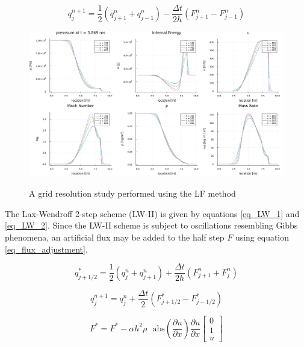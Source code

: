 \documentclass{article}
\newcommand{\pd}[2]{\frac{\partial #1}{\partial #2}}
\newcommand{\abs}{\text{abs}}
\begin{document}
\begin{equation}
	q_{j}^{n+1}
	=
	\frac{1}{2}
	\left(
		q_{j+1}^n
		+
		q_{j-1}^n
	\right)
	-
	\frac{\Delta t}{2h}
	\left(
		F_{j+1}^n
		-
		F_{j-1}^n
	\right)
	\label{eq_LF}
\end{equation}


\begin{figure}[H]
	\centering
	\includegraphics[width=\textwidth]{./figs/n_compare.png}
	\label{fig_n_compare}
	\caption{A grid resolution study performed using the LF method}
\end{figure}

The Lax-Wendroff 2-step scheme (LW-II) is given by equations \ref{eq_LW_1} and \ref{eq_LW_2}. Since the 
LW-II scheme is subject to oscillations resembling Gibbs phenomena, an artificial flux may be added to the 
half step $F$ using equation \ref{eq_flux_adjustment}.

\begin{equation}
	q_{j+1/2}^*
	=
	\frac{1}{2}
	\left(
		q_{j}^{n}
		+
		q_{j+1}^n
	\right)
	+
	\frac{\Delta t}{2h}
	\left(
		F_{j+1}^n
		+
		F_{j}^n
	\right)
	\label{eq_LW_1}
\end{equation}

\begin{equation}
	q_{j}^{n+1}
	=
	q_j^{n}
	+
	\frac{\Delta t}{2}
	\left(
		F_{j+1/2}^*
		-
		F_{j-1/2}^*
	\right)
	\label{eq_LW_2}
\end{equation}

\begin{equation}
	F^*
	= 
	F^* 
	- 
	\alpha h^2 \rho
	\text{ }
	\abs
	\left(
		\pd{u}{x}
	\right)
	\pd{u}{x}
	\begin{bmatrix}
		0 \\
		1 \\
		u
	\end{bmatrix}
	\label{eq_flux_adjustment}
\end{equation}
\end{document}
